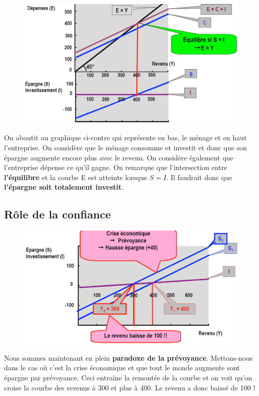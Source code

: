 \begin{figure}
\includegraphics[scale=0.3]{55}
\end{figure}
On aboutit au graphique ci-contre qui représente en bas, le ménage et en haut l'entreprise. On considère que le ménage consomme et investit et donc que son épargne augmente encore plus avec le revenu. On considère également que l'entreprise dépense ce qu'il gagne. On remarque que l'intersection entre \textbf{l'équilibre} et la courbe E est atteinte lorsque $S = I$. Il faudrait donc que \textbf{l'épargne soit totalement investit}. 

\subsection{Rôle de la confiance}
\begin{figure}
\includegraphics[scale=0.3]{56}
\end{figure}
Nous sommes maintenant en plein \textbf{paradoxe de la prévoyance}. Mettons-nous dans le cas où c'est la crise économique et que tout le monde augmente sont épargne par prévoyance. Ceci entraîne la remontée de la courbe et on voit qu'on croise la courbe des revenus à 300 et plus à 400. Le revenu a donc baissé de 100 ! 

